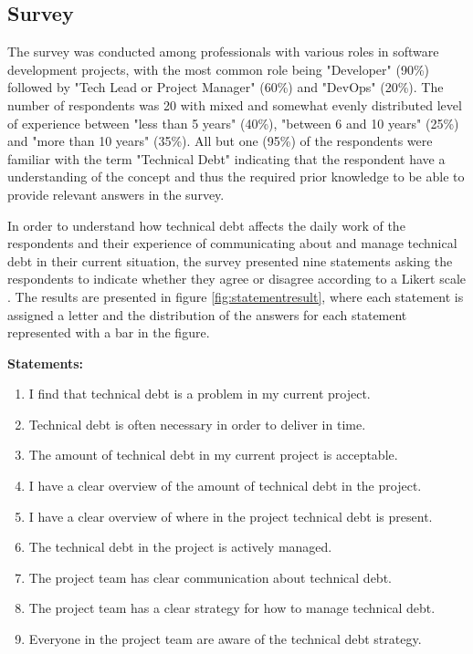 \subsection{Survey}
The survey was conducted among professionals with various roles in software development projects, with the most common role being "Developer" (90\%) followed by "Tech Lead or Project Manager" (60\%) and "DevOps" (20\%).
The number of respondents was 20 with mixed and somewhat evenly distributed level of experience between "less than 5 years" (40\%), "between 6 and 10 years" (25\%) and "more than 10 years" (35\%).
All but one (95\%) of the respondents were familiar with the term "Technical Debt" indicating that the respondent have a understanding of the concept and thus the required prior knowledge to be able to provide relevant answers in the survey.

In order to understand how technical debt affects the daily work of the respondents and their experience of communicating about and manage technical debt in their current situation, the survey presented nine statements asking the respondents to indicate whether they agree or disagree according to a Likert scale \cite{wilson_questionnaires_2013}.
The results are presented in figure \ref{fig:statementresult}, where each statement is assigned a letter and the distribution of the answers for each statement represented with a bar in the figure.

\smallskip
\textbf{Statements:}
\begin{enumerate}[label=\alph*)]
  \item I find that technical debt is a problem in my current project.
  \item Technical debt is often necessary in order to deliver in time.
  \item The amount of technical debt in my current project is acceptable.
  \item I have a clear overview of the amount of technical debt in the project.
  \item I have a clear overview of where in the project technical debt is present.
  \item The technical debt in the project is actively managed.
  \item The project team has clear communication about technical debt.
  \item The project team has a clear strategy for how to manage technical debt.
  \item Everyone in the project team are aware of the technical debt strategy.
\end{enumerate}
\smallskip

